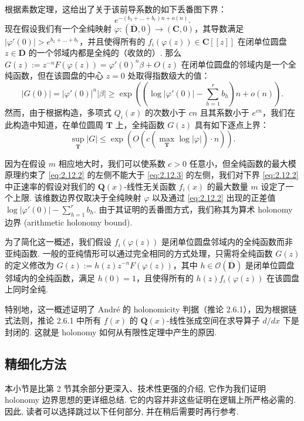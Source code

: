 根据素数定理，这给出了关于该前导系数的如下丢番图下界：
\[ e^{-(b_1+\dots+b_r)n+o(n)}. \]
现在假设我们有一个全纯映射 $\varphi: (\overline{\mathbf{D}},0) \to (\mathbf{C},0)$，其导数满足 $|\varphi'(0)| > e^{b_1 + \dots + b_r}$，并且使得所有的 $f_i(\varphi(z)) \in \mathbf{C}[\! [z]\!]$ 在闭单位圆盘 $z \in \overline{\mathbf{D}}$ 的一个邻域内都是全纯的（收敛的）. 那么 $G(z) := z^{-n}F(\varphi(z)) = \varphi'(0)^n\beta + O(z)$ 在闭单位圆盘的邻域内是一个全纯函数，但在该圆盘的中心 $z=0$ 处取得指数级大的值：
\begin{equation}\label{eq:2.12.2}
|G(0)| = |\varphi'(0)|^n |\beta| \ge \exp\left(\left(\log|\varphi'(0)| - \sum_{h=1}^r b_h\right) n + o(n)\right).
\end{equation}
然而，由于根据构造，多项式 $Q_i(x)$ 的次数小于 $cn$ 且其系数小于 $e^{cn}$，我们在此构造中知道，在单位圆周 $\mathbf{T}$ 上，全纯函数 $G(z)$ 具有如下逐点上界：
\begin{equation}\label{eq:2.12.3}\tag{2.12.3}
\sup_{\mathbf{T}} |G| \le \exp\left(O\left(c\left(\max_{\mathbf{T}} \log |\varphi|\right) \cdot n\right)\right).
\end{equation}

因为在假设 $m$ 相应地大时，我们可以使系数 $c>0$ 任意小，但全纯函数的最大模原理约束了 \eqref{eq:2.12.2} 的左侧不能大于 \eqref{eq:2.12.3} 的左侧，我们对下界 \eqref{eq:2.12.2} 中正速率的假设对我们的 $\mathbf{Q}(x)$-线性无关函数 $f_i(x)$ 的最大数量 $m$ 设定了一个上限. 该维数边界仅取决于全纯映射 $\varphi$ 以及通过 \eqref{eq:2.12.2} 出现的正差值 $\log |\varphi'(0)| - \sum_{h=1}^r b_h$. 由于其证明的丢番图方式，我们称其为算术 holonomy 边界 (arithmetic holonomy bound).

为了简化这一概述，我们假设 $f_i(\varphi(z))$ 是闭单位圆盘邻域内的全纯函数而非亚纯函数. 一般的亚纯情形可以通过完全相同的方式处理，只需将全纯函数 $G(z)$ 的定义修改为 $G(z) := h(z)z^{-n}F(\varphi(z))$，其中 $h \in \mathcal{O}(\overline{\mathbf{D}})$ 是闭单位圆盘邻域内的全纯函数，满足 $h(0) = 1$，且使得所有的 $h(z)f_i(\varphi(z))$ 在该圆盘上同时全纯.

特别地，这一概述证明了 André 的 holonomicity 判据（推论 2.6.1），因为根据链式法则，推论 2.6.1 中所有 $f(x)$ 的 $\mathbf{Q}(x)$-线性张成空间在求导算子 $d/dx$ 下是封闭的. 这就是 holonomy 如何从有限性定理中产生的原因.

\subsection{精细化方法}\label{sec:2.13}

本小节是比第 2 节其余部分更深入、技术性更强的介绍, 它作为我们证明 holonomy 边界思想的更详细总结. 它的内容并非这些证明在逻辑上所严格必需的. 因此, 读者可以选择跳过以下任何部分, 并在稍后需要时再行参考.

